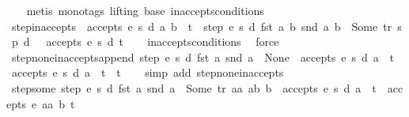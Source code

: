 \begin{isabellebody}
%
\isadelimproof
\ \ %
\endisadelimproof
%
\isatagproof
{}\isamarkupfalse%
\ {\isacharparenleft}metis\ {\isacharparenleft}mono{\isacharunderscore}tags{\isacharcomma}\ lifting{\isacharparenright}\ base\ inaccepts{\isacharunderscore}conditions{\isacharparenright}%
\endisatagproof
{\isafoldproof}%
%
\isadelimproof
\isanewline
%
\endisadelimproof
\isanewline
{}\isamarkupfalse%
\ step{\isacharunderscore}inaccepts{\isacharcolon}\ {\isachardoublequoteopen}{\isasymnot}\ accepts\ e\ s\ d\ {\isacharparenleft}{\isacharparenleft}a{\isacharcomma}\ b{\isacharparenright}\ {\isacharhash}\ t{\isacharparenright}\ {\isasymLongrightarrow}\ step\ e\ s\ d\ {\isacharparenleft}fst\ {\isacharparenleft}a{\isacharcomma}\ b{\isacharparenright}{\isacharparenright}\ {\isacharparenleft}snd\ {\isacharparenleft}a{\isacharcomma}\ b{\isacharparenright}{\isacharparenright}\ {\isacharequal}\ Some\ {\isacharparenleft}tr{\isacharcomma}\ s{\isacharprime}{\isacharcomma}\ p{\isacharprime}{\isacharcomma}\ d{\isacharprime}{\isacharparenright}\ {\isasymLongrightarrow}\ {\isasymnot}\ accepts\ e\ s{\isacharprime}\ d{\isacharprime}\ t{\isachardoublequoteclose}\isanewline
%
\isadelimproof
\ \ %
\endisadelimproof
%
\isatagproof
{}\isamarkupfalse%
\ inaccepts{\isacharunderscore}conditions\ \isamarkupfalse%
\ force%
\endisatagproof
{\isafoldproof}%
%
\isadelimproof
\isanewline
%
\endisadelimproof
\isanewline
{}\isamarkupfalse%
\ step{\isacharunderscore}none{\isacharunderscore}inaccepts{\isacharunderscore}append{\isacharcolon}\ {\isachardoublequoteopen}step\ e\ s\ d\ {\isacharparenleft}fst\ a{\isacharparenright}\ {\isacharparenleft}snd\ a{\isacharparenright}\ {\isacharequal}\ None\ {\isasymLongrightarrow}\ {\isasymnot}accepts\ e\ s\ d\ {\isacharparenleft}a\ {\isacharhash}\ t{\isacharparenright}\ {\isasymand}\ {\isasymnot}accepts\ e\ s\ d\ {\isacharparenleft}a\ {\isacharhash}\ t\ {\isacharat}\ t{\isacharprime}{\isacharparenright}{\isachardoublequoteclose}\isanewline
%
\isadelimproof
\ \ %
\endisadelimproof
%
\isatagproof
{}\isamarkupfalse%
\ {\isacharparenleft}simp\ add{\isacharcolon}\ step{\isacharunderscore}none{\isacharunderscore}inaccepts{\isacharparenright}%
\endisatagproof
{\isafoldproof}%
%
\isadelimproof
\isanewline
%
\endisadelimproof
\isanewline
{}\isamarkupfalse%
\ step{\isacharunderscore}some{\isacharcolon}\ {\isachardoublequoteopen}step\ e\ s\ d\ {\isacharparenleft}fst\ a{\isacharparenright}\ {\isacharparenleft}snd\ a{\isacharparenright}\ {\isacharequal}\ Some\ {\isacharparenleft}tr{\isacharcomma}\ aa{\isacharcomma}\ ab{\isacharcomma}\ b{\isacharparenright}\ {\isasymLongrightarrow}\ accepts\ e\ s\ d\ {\isacharparenleft}a\ {\isacharhash}\ t{\isacharparenright}\ {\isacharequal}\ accepts\ e\ aa\ b\ t{\isachardoublequoteclose}\isanewline

\end{isabellebody}
